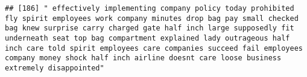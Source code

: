 \documentclass[
]{article}
\begin{document}
\begin{verbatim}
## [186] " effectively implementing company policy today prohibited fly spirit employees work company minutes drop bag pay small checked bag knew surprise carry charged gate half inch large supposedly fit underneath seat top bag compartment explained lady outrageous half inch care told spirit employees care companies succeed fail employees company money shock half inch airline doesnt care loose business extremely disappointed"                                                                                                                                                                                                                                                                                                                                                                                                                                                                                                                                                                                                                                                                                                                                                                                                                                                                                                                                                                                                                                                                                                                                                                                                                                                                                                                                                           

\end{verbatim}
\end{document}
